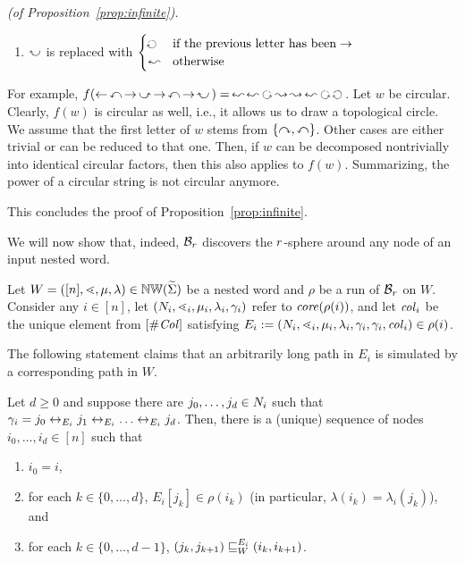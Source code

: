 \documentclass{LMCS}
\begin{document}
\begin{Proof}{\it (of Proposition~\ref{prop:infinite}).}
\begin{enumerate}[$\bullet$]
\item $\lefttwo$ is replaced with
$\begin{cases}
\rightleft & \text{if the previous letter has been} \rightarrow\\
\leftleft & \text{otherwise}
\end{cases}$
\end{enumerate}
For example, $f(\leftarrow~\! \leftone~\! \rightarrow~\! \righttwo~\!
\rightarrow~\! \leftone~\! \rightarrow~\! \lefttwo~\!) =~\! \leftleft~\!
\leftleft~ \leftright~ \rightright~\! \rightright~\! \leftleft~ \leftright~
\rightleft$\,. Let $w$ be circular. Clearly, $f(w)$ is circular as well, i.e.,
it allows us to draw a topological circle. We assume that the first letter of
$w$ stems from $\{\rightone,\leftone\}$. Other cases are either trivial or can
be reduced to that one. Then, if $w$ can be decomposed nontrivially into
identical circular factors, then this also applies to $f(w)$. Summarizing, the
power of a circular string is not circular anymore.






This concludes the proof of Proposition~\ref{prop:infinite}.
\end{Proof}


We will now show that, indeed, $\WA_\radius$ discovers the $\radius$-sphere
around any node of an input nested word.

Let $W = ([n],\succord,\mu,\lambda) \in \NW(\crSigma)$ be a nested word and
$\rho$ be a run of $\WA_\radius$ on $W$. Consider any $i \in [n]$, let
$(\Nat_i,\succord_i,\mu_i,\lambda_i,\gamma_i)$ refer to $\core(\rho(i))$, and
let $\inst_i$ be the unique element from $[\const]$ satisfying $E_i :=
(\Nat_i,\succord_i,\mu_i,\lambda_i,\gamma_i,\gamma_i,\inst_i) \in \rho(i)$.



 The following statement claims that an arbitrarily long path in $E_i$ is
 simulated by a corresponding path in $W$.

\begin{myclaim}\label{cl:simulate}
  Let $d \ge 0$ and suppose there are $j_0,\ldots,j_d \in \Nat_{i}$ such that
  $\gamma_{i} = j_0 \edge{E_i} j_1 \edge{E_i} \ldots \edge{E_i} j_d$. Then,
  there is a (unique) sequence of nodes $i_0,\ldots,i_d \in [n]$ such that
  \begin{enumerate}[$\bullet$]\itemsep=0.5ex
\item $i_0 = i$,
\item for each $k \in \{0,\ldots,d\}$, $E_i[j_k] \in \rho(i_k)$ (in particular,
  $\lambda(i_k) = \lambda_i(j_k)$), and
\item for each $k \in \{0,\ldots,d-1\}$,
  $\wsimulate{E_i}{W}{(j_k,j_{k+1})}{(i_k,i_{k+1})}$.
\end{enumerate}
\end{myclaim}
\end{document}
